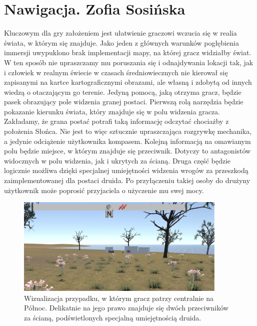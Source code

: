 \section{Nawigacja. Zofia Sosińska}\label{chap:naw}

    Kluczowym dla gry założeniem jest ułatwienie graczowi wczucia się w realia świata, w którym się znajduje. Jako jeden z głównych warunków pogłębienia immersji uwypuklono brak implementacji mapy, na której gracz widziałby świat. W ten sposób nie upraszczamy mu poruszania się i odnajdywania lokacji tak, jak i człowiek w realnym świecie w czasach średniowiecznych nie kierował się zapisanymi na kartce kartograficznymi obrazami, ale własną i zdobytą od innych wiedzą o otaczającym go terenie. 
    Jedyną pomocą, jaką otrzyma gracz, będzie pasek obrazujący pole widzenia granej postaci. Pierwszą rolą narzędzia będzie pokazanie kierunku świata, który znajduje się w polu widzenia gracza. Zakładamy, że grana postać potrafi taką informację odczytać chociażby z położenia Słońca. Nie jest to więc sztucznie upraszczająca rozgrywkę mechanika, a jedynie odciążenie użytkownika kompasem. 
    Kolejną informacją na omawianym polu będzie miejsce, w którym znajduje się przeciwnik. Dotyczy to antagonistów widocznych w polu widzenia, jak i ukrytych za ścianą. Druga część będzie logicznie możliwa dzięki specjalnej umiejętności widzenia wrogów za przeszkodą zaimplementowanej dla postaci druida. Po przyłączeniu takiej osoby do drużyny użytkownik może poprosić przyjaciela o użyczenie mu swej mocy.

\begin{figure}[htbp]
    \centering
    \includegraphics[width=0.9\textwidth]{images/ui/compass.png}
    \caption{Wizualizacja przypadku, w którym gracz patrzy centralnie na Północ. Delikatnie na jego prawo znajduje się dwóch przeciwników za ścianą, podświetlonych specjalną umiejętnością druida.
    }\label{fig:compass}
\end{figure}